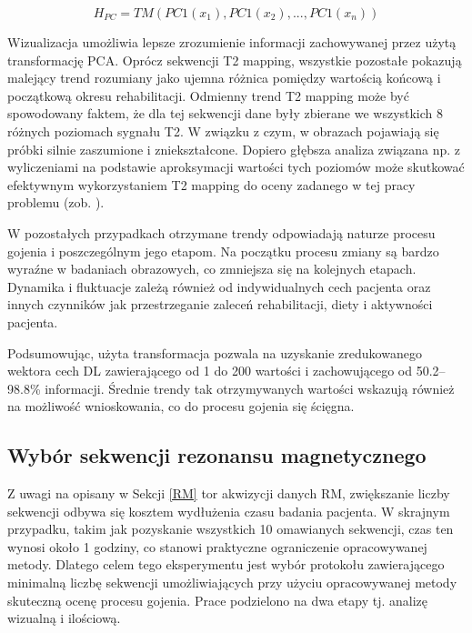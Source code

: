 \begin{equation}
\label{ecq:HPC}
H_{PC} = TM(PC1(x_1), PC1(x_2),..., PC1(x_n))
\end{equation}

Wizualizacja umożliwia lepsze zrozumienie informacji zachowywanej przez użytą transformację PCA. Oprócz sekwencji T2 mapping, wszystkie pozostałe pokazują malejący trend rozumiany jako ujemna różnica pomiędzy wartością końcową i początkową okresu rehabilitacji. Odmienny trend T2 mapping może być spowodowany faktem, że dla tej sekwencji dane były zbierane we wszystkich 8 różnych poziomach sygnału T2. W związku z czym, w obrazach pojawiają się próbki silnie zaszumione i zniekształcone. Dopiero głębsza analiza związana np. z wyliczeniami na podstawie aproksymacji wartości tych poziomów może skutkować efektywnym wykorzystaniem T2 mapping do oceny zadanego w tej pracy problemu (zob. \cite{Regulski2017}). 

W pozostałych przypadkach otrzymane trendy odpowiadają naturze procesu gojenia i poszczególnym jego etapom. Na początku procesu zmiany są bardzo wyraźne w badaniach obrazowych, co zmniejsza się na kolejnych etapach. Dynamika i fluktuacje zależą również od indywidualnych cech pacjenta oraz innych czynników jak przestrzeganie zaleceń rehabilitacji, diety i aktywności pacjenta. 

Podsumowując, użyta transformacja pozwala na uzyskanie zredukowanego wektora cech DL zawierającego od 1 do 200 wartości i zachowującego od 50.2--98.8\% informacji. Średnie trendy tak otrzymywanych wartości wskazują również na możliwość wnioskowania, co do procesu gojenia się ścięgna.  


\subsection{Wybór sekwencji rezonansu magnetycznego}
\label{seq:protocol_selection}
Z uwagi na opisany w Sekcji \ref{RM} tor akwizycji danych RM, zwiększanie liczby sekwencji odbywa się kosztem wydłużenia czasu badania pacjenta. W skrajnym przypadku, takim jak pozyskanie wszystkich 10 omawianych sekwencji, czas ten wynosi około 1 godziny, co stanowi praktyczne ograniczenie opracowywanej metody. Dlatego celem tego eksperymentu jest wybór protokołu zawierającego minimalną liczbę sekwencji umożliwiających przy użyciu opracowywanej metody skuteczną ocenę procesu gojenia. Prace podzielono na dwa etapy tj. analizę wizualną i ilościową.


